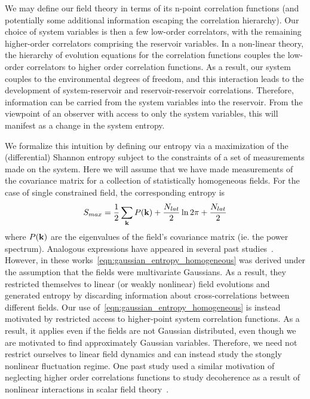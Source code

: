 \documentclass[11pt,a4paper]{article}
\begin{document}
We may define our field theory in terms of its n-point correlation functions (and potentially some additional information escaping the correlation hierarchy).
Our choice of system variables is then a few low-order correlators, with the remaining higher-order correlators comprising the reservoir variables.
In a non-linear theory, the hierarchy of evolution equations for the correlation functions couples the low-order correlators to higher order correlation functions.
As a result, our system couples to the environmental degrees of freedom, and this interaction leads to the development of system-reservoir and reservoir-reservoir correlations.
Therefore, information can be carried from the system variables into the reservoir.
From the viewpoint of an observer with access to only the system variables, this will manifest as a change in the system entropy.

We formalize this intuition by defining our entropy via a maximization of the (differential) Shannon entropy subject to the constraints of a set of measurements made on the system.
Here we will assume that we have made measurements of the covariance matrix for a collection of statistically homogeneous fields.
For the case of single constrained field, the corresponding entropy is
\begin{equation}
  S_{max} = \frac{1}{2}\sum_{\bf k}P({\bf k}) + \frac{N_{lat}}{2}\ln 2\pi + \frac{N_{lat}}{2}
  \label{eqn:gaussian_entropy_homogeneous}
\end{equation}
where $P({\bf k})$ are the eigenvalues of the field's covariance matrix (ie. the power spectrum).
Analogous expressions have appeared in several past studies~\cite{Brandenberger:1992jh,Prokopec:1992ia,Koksma:2009wa,Koksma:2010dt,Koksma:2010zi,Koksma:2011dy,Koksma:2011fx,Prokopec:2012xv,Campo:2008ij}.
However, in these works~\eqref{eqn:gaussian_entropy_homogeneous} was derived under the assumption that the fields were multivariate Gaussians.
As a result, they restricted themselves to linear (or weakly nonlinear) field evolutions and generated entropy by discarding information about cross-correlations between different fields.
Our use of~\eqref{eqn:gaussian_entropy_homogeneous} is instead motivated by restricted access to higher-point system correlation functions.
As a result, it applies even if the fields are not Gaussian distributed, even though we are motivated to find approximately Gaussian variables.
Therefore, we need not restrict ourselves to linear field dynamics and can instead study the stongly nonlinear fluctuation regime.
One past study used a similar motivation of neglecting higher order correlations functions to study decoherence as a result of nonlinear interactions in scalar field theory~\cite{Giraud:2009tn}.
\end{document}
